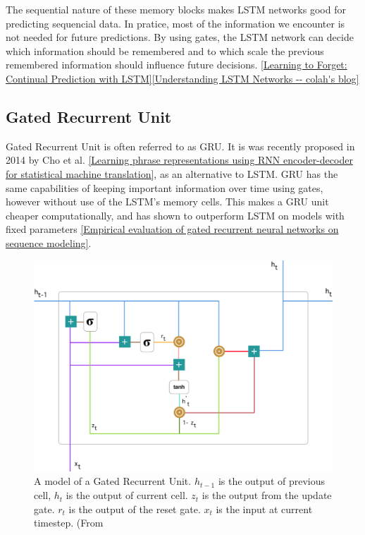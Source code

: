 The sequential nature of these memory blocks makes LSTM networks good for predicting sequencial data. In pratice, most of the information we encounter is not needed for future predictions. By using gates, the LSTM network can decide which information should be remembered and to which scale the previous remembered information should influence future decisions.  \ref{Learning to Forget: Continual Prediction with LSTM}\ref{Understanding LSTM Networks -- colah's blog}


\subsection{Gated Recurrent Unit}

Gated Recurrent Unit is often referred to as GRU. It is was recently proposed in 2014 by Cho et al. \ref{Learning phrase representations using RNN encoder-decoder for statistical machine translation}, as an alternative to LSTM. GRU has the same capabilities of keeping important information over time using gates, however without use of the LSTM's memory cells. This makes a GRU unit cheaper computationally, and has shown to outperform LSTM on models with fixed parameters \ref{Empirical evaluation of gated recurrent neural networks on sequence modeling}. 

\begin{figure}[H]
    \centering
    \includegraphics[width=\textwidth]{Assets/Chapter2_Theory/GRU-cell.png}
    \caption{A model of a Gated Recurrent Unit. $h_{t-1}$ is the output of previous cell, $h_t$ is the output of current cell. $z_t$ is the output from the update gate. $r_t$ is the output of the reset gate. $x_t$ is the input at current timestep. (From \cite{Understanding GRU networks}}
    \label{fig:gru-single-cell}
\end{figure}

